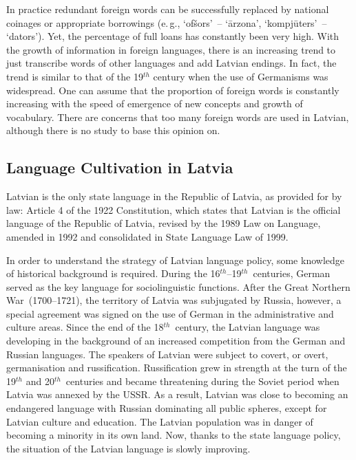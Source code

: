 \begin{multicols}{2}
In practice redundant foreign words can be successfully replaced by national coinages or appropriate borrowings (e.\,g., `ofšors'~-- `ārzona', `kompjūters'~-- `dators').  Yet, the percentage of full loans has constantly been very high.  With the growth of information in foreign languages, there is an increasing trend to just transcribe words of other languages and add Latvian endings.  In fact, the trend is similar to that of the 19${}^{th}$ century when the use of Germanisms was widespread.  One can assume that the proportion of foreign words is constantly increasing with the speed of emergence of new concepts and growth of vocabulary.  There are concerns that too many foreign words are used in Latvian, although there is no study to base this opinion on.

\subsection{Language Cultivation in Latvia}


Latvian is the only state language in the Republic of Latvia, as provided for by law: Article 4 of the 1922 Constitution, which states that Latvian is the official language of the Republic of Latvia, revised by the 1989 Law on Language, amended in 1992 and consolidated in State Language Law of 1999.

In order to understand the strategy of Latvian language policy, some knowledge of historical background is required.  During the 16${}^{th}$--19${}^{th}$~centuries, German served as the key language for sociolinguistic functions.  After the Great Northern War~(1700--1721), the territory of Latvia was subjugated by Russia, however, a special agreement was signed on the use of German in the administrative and culture areas.  Since the end of the 18${}^{th}$~century, the Latvian language was developing in the background of an increased competition from the German and Russian languages.  The speakers of Latvian were subject to covert, or overt, germanisation and russification.  Russification grew in strength at the turn of the 19${}^{th}$ and 20${}^{th}$~centuries and became threatening during the Soviet period when Latvia was annexed by the USSR.  As a result, Latvian was close to becoming an endangered language with Russian dominating all public spheres, except for Latvian culture and education.  The Latvian population was in danger of becoming a minority in its own land.  Now, thanks to the state language policy, the situation of the Latvian language is slowly improving.


\end{multicols}
